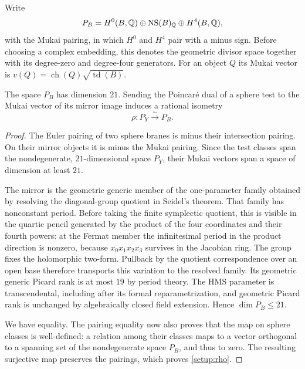 Write
\begin{equation}
 P_B=H^0(B,\mathbb Q)\oplus\operatorname{NS}(B)_{\mathbb Q}\oplus H^4(B,\mathbb Q),
 \label{setup:algebraic-mukai}
\end{equation}
with the Mukai pairing, in which $H^0$ and $H^4$ pair with a minus sign.
Before choosing a complex embedding, this denotes the geometric divisor
space together with its degree-zero and degree-four generators.
For an object $Q$ its Mukai vector is
$v(Q)=\operatorname{ch}(Q)\sqrt{\operatorname{td}(B)}$.

\begin{lemma}
\label{setup:rho-lemma}
The space $P_B$ has dimension $21$.  Sending the Poincar\'e dual of a
sphere test to the Mukai vector of its mirror image induces a rational
isometry
\begin{equation}
 \rho:P_Y\xrightarrow{\sim}P_B.
 \label{setup:rho}
\end{equation}
\end{lemma}

\begin{proof}
The Euler pairing of two sphere branes is minus their intersection
pairing.  On their mirror objects it is minus the Mukai pairing.
Since the test classes span the nondegenerate, $21$-dimensional space
$P_Y$, their Mukai vectors span a space of dimension at least $21$.

The mirror is the geometric generic member of the one-parameter family
obtained by resolving the diagonal-group quotient in Seidel's theorem.
That family has nonconstant period.  Before taking the finite symplectic
quotient, this is visible in the quartic pencil generated by the product
of the four coordinates and their fourth powers: at the Fermat member
the infinitesimal period in the product direction is nonzero, because
$x_0x_1x_2x_3$ survives in the Jacobian ring.  The group fixes the
holomorphic two-form.  Pullback by the quotient correspondence over an
open base therefore transports this variation to the resolved family.
Its geometric generic Picard rank is at most $19$ by period theory.
The HMS parameter is transcendental, including after its formal
reparametrization, and geometric Picard rank is unchanged by
algebraically closed field extension.  Hence $\dim P_B\le21$.

We have equality.  The pairing equality now also proves that the map on
sphere classes is well-defined: a relation among their classes maps to
a vector orthogonal to a spanning set of the nondegenerate space $P_B$,
and thus to zero.  The resulting surjective map preserves the pairings,
which proves \eqref{setup:rho}.
\end{proof}

